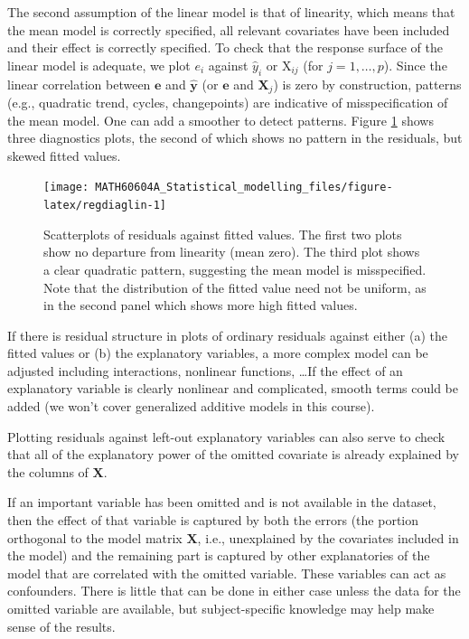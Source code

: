 \documentclass[
  11pt,
  letterpaper,
]{book}
\theoremstyle{definition}
\theoremstyle{definition}
\theoremstyle{definition}
\theoremstyle{definition}
\theoremstyle{remark}
\begin{document}
The second assumption of the linear model is that of linearity, which means that the mean model is correctly specified, all relevant covariates have been included and their effect is correctly specified.
To check that the response surface of the linear model is adequate, we plot \(e_i\) against \(\widehat{y}_i\) or \(\mathrm{X}_{ij}\) (for \(j=1, \ldots, p\)). Since the linear correlation between \(\boldsymbol{e}\) and \(\widehat{\boldsymbol{y}}\) (or \(\boldsymbol{e}\) and \(\mathbf{X}_j\)) is zero by construction, patterns (e.g., quadratic trend, cycles, changepoints) are indicative of misspecification of the mean model. One can add a smoother to detect patterns. Figure \ref{fig:regdiaglin} shows three diagnostics plots, the second of which shows no pattern in the residuals, but skewed fitted values.

\begin{figure}

{\centering \texttt{[image: MATH60604A\_Statistical\_modelling\_files/figure-latex/regdiaglin-1]} 

}

\caption{Scatterplots of residuals against fitted values. The first two plots show no departure from linearity (mean zero). The third plot shows a clear quadratic pattern, suggesting the mean model is misspecified. Note that the distribution of the fitted value need not be uniform, as in the second panel which shows more high fitted values.}\label{fig:regdiaglin}
\end{figure}

If there is residual structure in plots of ordinary residuals against either (a) the fitted values or (b) the explanatory variables, a more complex model can be adjusted including interactions, nonlinear functions, \ldots If the effect of an explanatory variable is clearly nonlinear and complicated, smooth terms could be added (we won't cover generalized additive models in this course).

Plotting residuals against left-out explanatory variables can also serve to check that all of the explanatory power of the omitted covariate is already explained by the columns of \(\mathbf{X}\).

If an important variable has been omitted and is not available in the dataset, then the effect of that variable is captured by both the errors (the portion orthogonal to the model matrix \(\mathbf{X}\), i.e., unexplained by the covariates included in the model) and the remaining part is captured by other explanatories of the model that are correlated with the omitted variable. These variables can act as confounders. There is little that can be done in either case unless the data for the omitted variable are available, but subject-specific knowledge may help make sense of the results.
\end{document}
